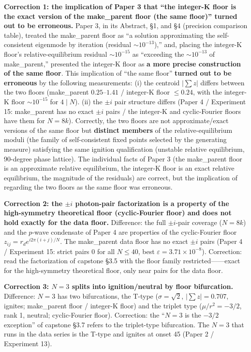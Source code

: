 \documentclass[
  a4paper,
]{ltjsarticle}
\begin{document}
\textbf{Correction 1: the implication of Paper 3 that ``the integer-K
floor is the exact version of the make\_parent floor (the same floor)''
turned out to be erroneous.} Paper 3, in its Abstract, §1, and §4
(precision comparison table), treated the make\_parent floor as ``a
solution approximating the self-consistent eigenmode by iteration
(residual \(\sim10^{-13}\)),'' and, placing the integer-K floor's
relative-equilibrium residual \(\sim10^{-15}\) as ``exceeding the
\(\sim10^{-13}\) of make\_parent,'' presented the integer-K floor as
\textbf{a more precise construction of the same floor}. This implication
of ``the same floor'' \textbf{turned out to be erroneous} by the
following measurements: (i) the centroid \(|\sum z|\) differs between
the two floors (make\_parent \(0.25\)--\(1.41\) / integer-K floor
\(\le0.24\), with the integer-K floor \(\sim10^{-15}\) for \(4\mid N\)).
(ii) the \(\pm i\) pair structure differs (Paper 4 / Experiment 15:
make\_parent has no exact \(\pm i\) pairs / the integer-K and
cyclic-Fourier floors have them for \(N=8k\)). Correctly, the two floors
are not approximate/exact versions of the same floor but
\textbf{distinct members} of the relative-equilibrium moduli (the family
of self-consistent fixed points selected by the generating measure)
satisfying the same ignition qualification (unstable relative
equilibrium, 90-degree phase lattice). The individual facts of Paper 3
(the make\_parent floor is an approximate relative equilibrium, the
integer-K floor is an exact relative equilibrium, the magnitude of the
residuals) are correct, but the implication of regarding the two floors
as the same floor was erroneous.

\textbf{Correction 2: the \(\pm i\) photon-pair factorization is a
property of the high-symmetry theoretical floor (cyclic-Fourier floor)
and does not hold exactly for the data floor.} Difference: the full
\(\pm i\)-pair coverage (\(N=8k\)) and the \(p\)-wave condensate of
Paper 4 are properties of the cyclic-Fourier floor
\(z_{ij}=r_d e^{i2\pi(i+j)/N}\). The make\_parent data floor has no
exact \(\pm i\) pairs (Paper 4 / Experiment 15: strict pairs 0 for all
\(N\le40\), best \(\varepsilon=3.71\times10^{-8}\)). Correction: read
the factorization of capstone §3.5 with the floor family
restricted------exact for the high-symmetry theoretical floor, only near
pairs for the data floor.

\textbf{Correction 3: \(N=3\) splits into ignition/neutral by floor
bifurcation.} Difference: \(N=3\) has two bifurcations, the T-type
(\(\sigma=\sqrt2\), \(|\sum z|=0.707\), ignites; make\_parent floor /
integer-K floor) and the triplet type (\(\mu/r^2=-3/2\), rank 1,
neutral; cyclic-Fourier floor). Correction: the ``\(N=3\) is the
\(-3/2\) exception'' of capstone §3.7 refers to the triplet-type
bifurcation. The \(N=3\) that runs in the data series is the T-type and
ignites at onset 45 (Paper 2 / Experiment 13).
\end{document}
